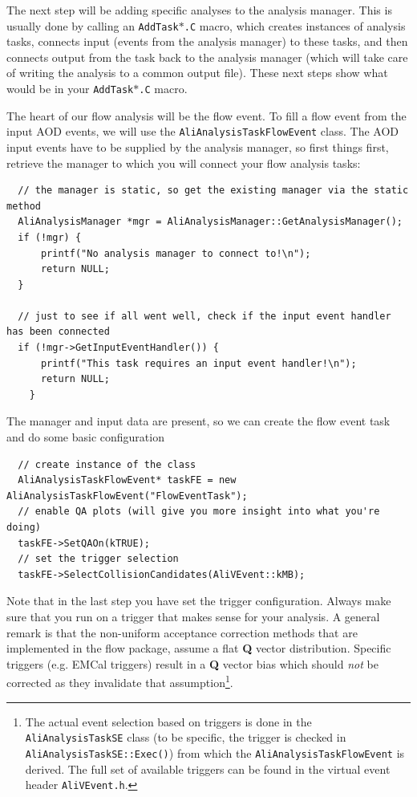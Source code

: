 \documentclass[a4paper]{book}
\numberwithin{equation}{subsection}
\begin{document}
\begin{description}
The next step will be adding specific analyses to the analysis manager. This is usually done by calling an \texttt{AddTask$\ast$.C} macro, which creates instances of analysis tasks, connects input (events from the analysis manager) to these tasks, and then connects output from the task back to the analysis manager (which will take care of writing the analysis to a common output file). These next steps show what would be in your \texttt{AddTask$\ast$.C} macro.
  
The heart of our flow analysis will be the flow event. To fill a flow event from the input AOD events, we will use the \texttt{AliAnalysisTaskFlowEvent} class. The AOD input events have to be supplied by the analysis manager, so first things first, retrieve the manager to which you will connect your flow analysis tasks:

\begin{lstlisting}
  // the manager is static, so get the existing manager via the static method
  AliAnalysisManager *mgr = AliAnalysisManager::GetAnalysisManager();
  if (!mgr) {
      printf("No analysis manager to connect to!\n");
      return NULL;
  }
        
  // just to see if all went well, check if the input event handler has been connected
  if (!mgr->GetInputEventHandler()) {
      printf("This task requires an input event handler!\n");
      return NULL;
    }\end{lstlisting}
    
The manager and input data are present, so we can create the flow event task and do some basic configuration
\begin{lstlisting}
  // create instance of the class
  AliAnalysisTaskFlowEvent* taskFE = new AliAnalysisTaskFlowEvent("FlowEventTask");
  // enable QA plots (will give you more insight into what you're doing)
  taskFE->SetQAOn(kTRUE);
  // set the trigger selection
  taskFE->SelectCollisionCandidates(AliVEvent::kMB);
\end{lstlisting}
Note that in the last step you have set the trigger configuration. Always make sure that you run on a trigger that makes sense for your analysis. A general remark is that the non-uniform acceptance correction methods that are implemented in the flow package, assume a flat \textbf{Q} vector distribution. Specific triggers (e.g. EMCal triggers) result in a \textbf{Q} vector bias which should \emph{not} be corrected as they invalidate that assumption\footnote{The actual event selection based on triggers is done in the \texttt{AliAnalysisTaskSE} class (to be specific, the trigger is checked in \texttt{AliAnalysisTaskSE::Exec()}) from which the \texttt{AliAnalysisTaskFlowEvent} is derived. The full set of available triggers can be found in the virtual event header \texttt{AliVEvent.h}. }.


\end{description}
\end{document}

